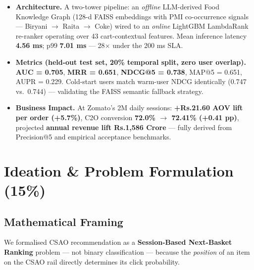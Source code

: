 \documentclass[11pt,a4paper]{article}
\newcommand{\TO}{$\rightarrow$}
\begin{document}
\begin{execbox}[title=Solution Overview]
\begin{itemize}[leftmargin=*, noitemsep]

  \item \textbf{Architecture.}
    A two-tower pipeline: an \emph{offline} LLM-derived Food Knowledge Graph
    (128-d FAISS embeddings with PMI co-occurrence signals ---
    Biryani \TO{} Raita \TO{} Coke) wired to an \emph{online} LightGBM
    LambdaRank re-ranker operating over 43 cart-contextual features.
    Mean inference latency \textbf{4.56 ms}; p99 \textbf{7.01 ms} ---
    28$\times$ under the 200 ms SLA.

  \item \textbf{Metrics (held-out test set, 20\% temporal split, zero user overlap).}
    \textbf{AUC = 0.705}, \textbf{MRR = 0.651},
    \textbf{NDCG@5 = 0.738}, MAP@5 = 0.651, AUPR = 0.229.
    Cold-start users match warm-user NDCG identically (0.747 vs.\ 0.744) ---
    validating the FAISS semantic fallback strategy.

  \item \textbf{Business Impact.}
    At Zomato's 2M daily sessions: \textbf{+Rs.21.60 AOV lift per order
    (+5.7\%)}, C2O conversion \textbf{72.0\% \TO{} 72.41\% (+0.41 pp)},
    projected \textbf{annual revenue lift Rs.1{,}586 Crore} ---
    fully derived from Precision@5 and empirical acceptance benchmarks.

\end{itemize}
\end{execbox}

\section{Ideation \& Problem Formulation (15\%)}

\subsection{Mathematical Framing}

We formalised CSAO recommendation as a \textbf{Session-Based Next-Basket
Ranking} problem --- not binary classification --- because the
\emph{position} of an item on the CSAO rail directly determines its
click probability.
\end{document}
